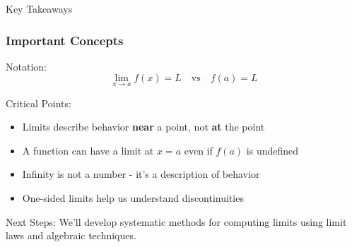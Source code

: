 \documentclass[aspectratio=169]{beamer}
\newcommand{\limxa}[1]{\lim_{x \to a} #1}
\begin{document}
\begin{frame}{Key Takeaways}
\frametitle{Important Concepts}

\begin{block}{Notation:}
$$\limxa{f(x)} = L \quad \text{vs} \quad f(a) = L$$
\end{block}

\begin{block}{Critical Points:}
\begin{itemize}
\item Limits describe behavior \textbf{near} a point, not \textbf{at} the point
\item A function can have a limit at $x = a$ even if $f(a)$ is undefined
\item Infinity is not a number - it's a description of behavior
\item One-sided limits help us understand discontinuities
\end{itemize}
\end{block}

\begin{block}{Next Steps:}
We'll develop systematic methods for computing limits using limit laws and algebraic techniques.
\end{block}

\end{frame}
\end{document}
